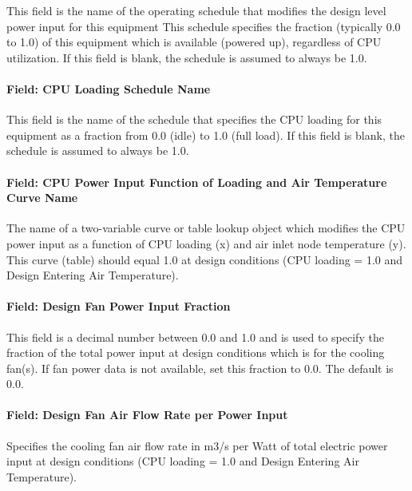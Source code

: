 This field is the name of the operating schedule that modifies the design level power input for this equipment This schedule specifies the fraction (typically 0.0 to 1.0) of this equipment which is available (powered up), regardless of CPU utilization. If this field is blank, the schedule is assumed to always be 1.0.

\paragraph{Field: CPU Loading Schedule Name}\label{field-cpu-loading-schedule-name}

This field is the name of the schedule that specifies the CPU loading for this equipment as a fraction from 0.0 (idle) to 1.0 (full load). If this field is blank, the schedule is assumed to always be 1.0.

\paragraph{Field: CPU Power Input Function of Loading and Air Temperature Curve Name}\label{field-cpu-power-input-function-of-loading-and-air-temperature-curve-name}

The name of a two-variable curve or table lookup object which modifies the CPU power input as a function of CPU loading (x) and air inlet node temperature (y). This curve (table) should equal 1.0 at design conditions (CPU loading = 1.0 and Design Entering Air Temperature).

\paragraph{Field: Design Fan Power Input Fraction}\label{field-design-fan-power-input-fraction}

This field is a decimal number between 0.0 and 1.0 and is used to specify the fraction of the total power input at design conditions which is for the cooling fan(s). If fan power data is not available, set this fraction to 0.0. The default is 0.0.

\paragraph{Field: Design Fan Air Flow Rate per Power Input}\label{field-design-fan-air-flow-rate-per-power-input}

Specifies the cooling fan air flow rate in m3/s per Watt of total electric power input at design conditions (CPU loading = 1.0 and Design Entering Air Temperature).

